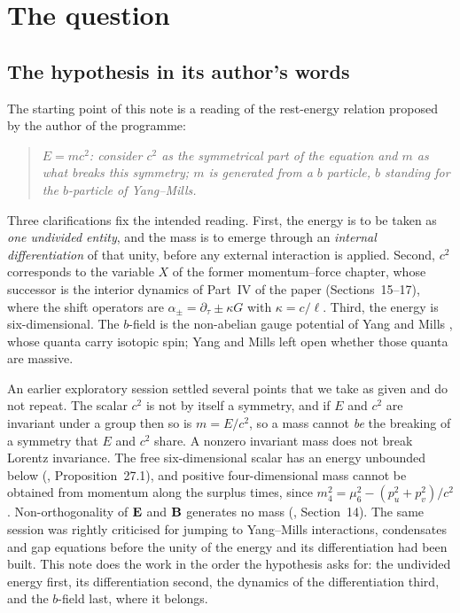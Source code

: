 \section{The question}
\label{s0:sec:question}

\subsection{The hypothesis in its author's words}

The starting point of this note is a reading of the rest-energy relation proposed by the author of the programme:
\begin{quote}
\emph{$E=mc^2$: consider $c^2$ as the symmetrical part of the equation and $m$ as what breaks this symmetry; $m$ is generated from
a $b$ particle, $b$ standing for the $b$-particle of Yang--Mills.}
\end{quote}
Three clarifications fix the intended reading. First, the energy is to be taken as \emph{one undivided entity}, and the mass is to
emerge through an \emph{internal differentiation} of that unity, before any external interaction is applied. Second, $c^2$ corresponds to
the variable $X$ of the former momentum--force chapter, whose successor is the interior dynamics of Part~IV of the paper
\cite{ES17} (Sections~15--17), where the shift operators are $\alpha_\pm=\partial_\tau\pm\kappa G$ with $\kappa=c/\ell$. Third, the energy
is six-dimensional. The $b$-field is the non-abelian gauge potential of Yang and Mills \cite{YangMills54}, whose quanta carry isotopic
spin; Yang and Mills left open whether those quanta are massive.

An earlier exploratory session settled several points that we take as given and do not repeat. The scalar $c^2$ is not by itself a
symmetry, and if $E$ and $c^2$ are invariant under a group then so is $m=E/c^2$, so a mass cannot \emph{be} the breaking of a symmetry
that $E$ and $c^2$ share. A nonzero invariant mass does not break Lorentz invariance. The free six-dimensional scalar has an energy
unbounded below (\cite{ES17}, Proposition~27.1), and positive four-dimensional mass cannot be obtained from momentum along the surplus
times, since $m_4^2=\mu_6^2-(p_u^2+p_v^2)/c^2$. Non-orthogonality of $\mathbf E$ and $\mathbf B$ generates no mass (\cite{ES17}, Section~14). The same
session was rightly criticised for jumping to Yang--Mills interactions, condensates and gap equations before the unity of the energy and
its differentiation had been built. This note does the work in the order the hypothesis asks for: the undivided energy first, its
differentiation second, the dynamics of the differentiation third, and the $b$-field last, where it belongs.

